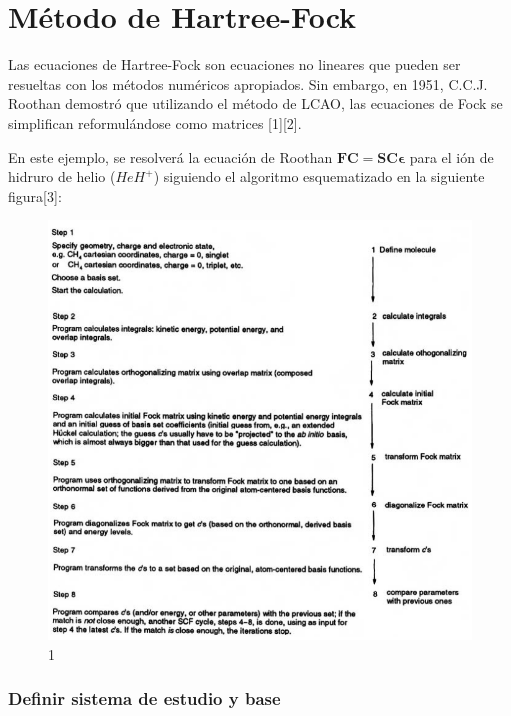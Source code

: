 \documentclass[
  letterpaper,
  DIV=11,
  numbers=noendperiod]{scrreprt}
\begin{document}

\hypertarget{muxe9todo-de-hartree-fock}{%
\chapter{Método de Hartree-Fock}\label{muxe9todo-de-hartree-fock}}

Las ecuaciones de Hartree-Fock son ecuaciones no lineares que pueden ser
resueltas con los métodos numéricos apropiados. Sin embargo, en 1951,
C.C.J. Roothan demostró que utilizando el método de LCAO, las ecuaciones
de Fock se simplifican reformulándose como matrices {[}1{]}{[}2{]}.

En este ejemplo, se resolverá la ecuación de Roothan
\(\textbf{F}\textbf{C}=\textbf{S}\textbf{C}\pmb{\epsilon}\) para el ión
de hidruro de helio (\(HeH^{+}\)) siguiendo el algoritmo esquematizado
en la siguiente figura{[}3{]}:

\begin{figure}

{\centering \includegraphics{./images/im22.png}

}

\caption{1}

\end{figure}

\hypertarget{definir-sistema-de-estudio-y-base}{%
\subsection{Definir sistema de estudio y
base}\label{definir-sistema-de-estudio-y-base}}
\end{document}
